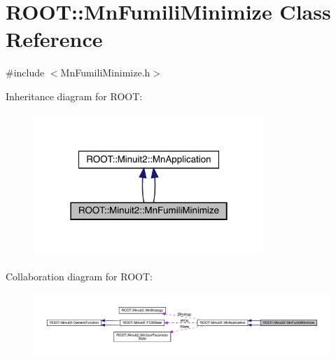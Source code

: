 \hypertarget{classROOT_1_1Minuit2_1_1MnFumiliMinimize}{}\section{R\+O\+OT\+:\+:Mn\+Fumili\+Minimize Class Reference}
\label{classROOT_1_1Minuit2_1_1MnFumiliMinimize}


{\ttfamily \#include $<$Mn\+Fumili\+Minimize.\+h$>$}



Inheritance diagram for R\+O\+OT\+:\nopagebreak
\begin{figure}[H]
\begin{center}
\leavevmode
\includegraphics[width=247pt]{d2/d78/classROOT_1_1Minuit2_1_1MnFumiliMinimize__inherit__graph}
\end{center}
\end{figure}


Collaboration diagram for R\+O\+OT\+:\nopagebreak
\begin{figure}[H]
\begin{center}
\leavevmode
\includegraphics[width=350pt]{dd/dcd/classROOT_1_1Minuit2_1_1MnFumiliMinimize__coll__graph}
\end{center}
\end{figure}
